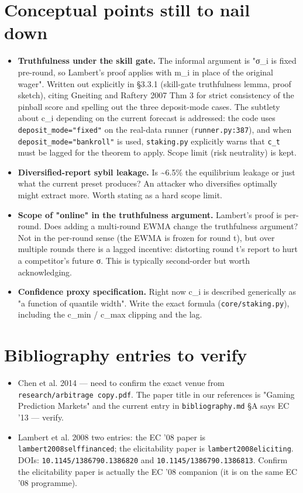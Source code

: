 \documentclass[11pt,a4paper,openany]{report}
\begin{document}
\section{Conceptual points still to nail down}

\begin{itemize}
  \item [x] \textbf{Truthfulness under the skill gate.} The informal argument is
    "σ\_i is fixed pre-round, so Lambert's proof applies with m\_i in
    place of the original wager". Written out explicitly in §3.3.1
    (skill-gate truthfulness lemma, proof sketch), citing Gneiting
    and Raftery 2007 Thm 3 for strict consistency of the pinball
    score and spelling out the three deposit-mode cases. The subtlety
    about c\_i depending on the current forecast is addressed: the
    code uses \texttt{deposit\_mode="fixed"} on the real-data runner
    (\texttt{runner.py:387}), and when \texttt{deposit\_mode="bankroll"} is used,
    \texttt{staking.py} explicitly warns that \texttt{c\_t} must be lagged for the
    theorem to apply. Scope limit (risk neutrality) is kept.
  \item [ ] \textbf{Diversified-report sybil leakage.} Is \textasciitilde{}6.5\% the
    equilibrium leakage or just what the current preset produces? An
    attacker who diversifies optimally might extract more. Worth
    stating as a hard scope limit.
  \item [ ] \textbf{Scope of "online" in the truthfulness argument.} Lambert's
    proof is per-round. Does adding a multi-round EWMA change the
    truthfulness argument? Not in the per-round sense (the EWMA is
    frozen for round t), but over multiple rounds there is a lagged
    incentive: distorting round t's report to hurt a competitor's
    future σ. This is typically second-order but worth acknowledging.
  \item [ ] \textbf{Confidence proxy specification.} Right now c\_i is described
    generically as "a function of quantile width". Write the exact
    formula (\texttt{core/staking.py}), including the c\_min / c\_max clipping
    and the lag.
\end{itemize}

\section{Bibliography entries to verify}

\begin{itemize}
  \item [ ] Chen et al. 2014 — need to confirm the exact venue from
    \texttt{research/arbitrage copy.pdf}. The paper title in our references is
    "Gaming Prediction Markets" and the current entry in
    \texttt{bibliography.md} §A says EC '13 — verify.
  \item [ ] Lambert et al. 2008 two entries: the EC '08 paper is
    \texttt{lambert2008selffinanced}; the elicitability paper is
    \texttt{lambert2008eliciting}. DOIs: \texttt{10.1145/1386790.1386820} and
    \texttt{10.1145/1386790.1386813}. Confirm the elicitability paper is
    actually the EC '08 companion (it is on the same EC '08 programme).
\end{itemize}
\end{document}
